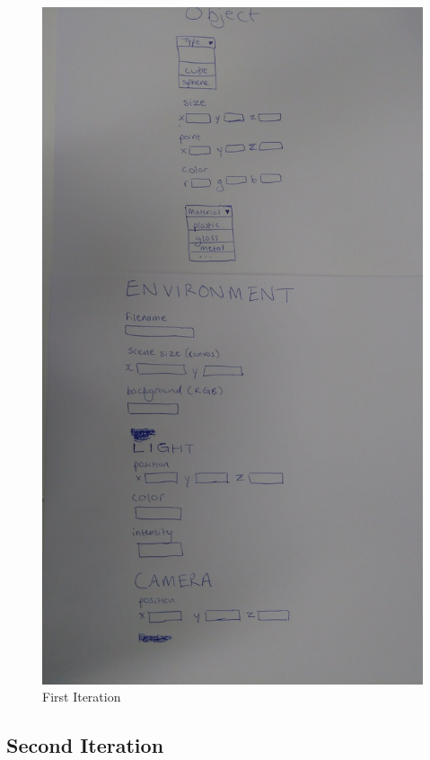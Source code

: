 \documentclass[a4paper]{report}
\begin{document}
	\begin{figure}[ht!]
		\centering
		\includegraphics[angle=90, scale=0.1]{First_Iteration_Prototype.jpg}
		\caption{First Iteration}
		\label{fig:firstIt}
	\end{figure}
	
	\subsection{Second Iteration}
	
\end{document}
